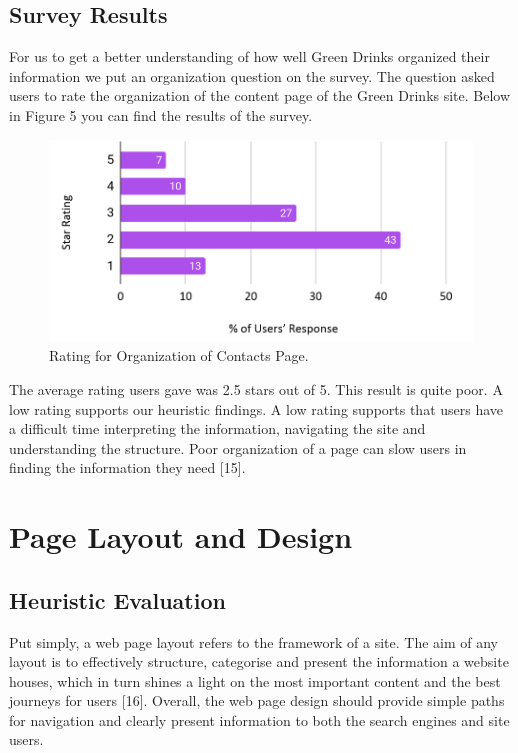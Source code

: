 \documentclass[12pt]{article}
\begin{document}
\subsection{Survey Results}
For us to get a better understanding of how well Green Drinks organized their information we put an organization question on the survey. The question asked users to rate the organization of the content page of the Green Drinks site. Below in Figure 5 you can find the results of the survey.

\begin{figure}[ht]
\centering
\includegraphics[width=1.0\textwidth]{f5}
\caption[Rating for Organization of Contacts Page]{Rating for Organization of Contacts Page\footnotemark.}
\end{figure} 
The average rating users gave was 2.5 stars out of 5. This result is quite poor. A low rating supports our heuristic findings. A low rating supports that users have a difficult time interpreting the information, navigating the site and understanding the structure. Poor organization of a page can slow users in finding the information they need [15].

\section{Page Layout and Design}



\subsection{Heuristic Evaluation}
Put simply, a web page layout refers to the framework of a site. The aim of any layout is to effectively structure, categorise and present the information a website houses, which in turn shines a light on the most important content and the best journeys for users [16]. Overall, the web page design should provide simple paths for navigation and clearly present information to both the search engines and site users. 
\end{document}
